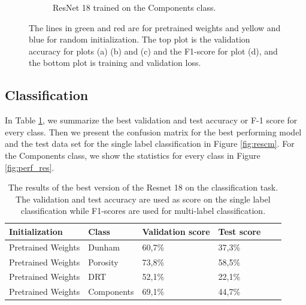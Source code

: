 \begin{figure}
{\begin{subfigure}[b]{.6\textwidth}
\label{fig:resinit_comp}
\caption{ResNet 18 trained on the Components class.}
\end{subfigure}%
}
\caption[Training and validation plots for ResNet 18]{The lines in green and red are for pretrained weights and yellow and blue for random initialization. The top plot is the validation accuracy for plots (a) (b) and (c) and the F1-score for plot (d), and the bottom plot is training  and validation loss.}
\label{fig:plotres}
\end{figure}

\subsection{Classification}
In Table \ref{tab:resbest}, we summarize the best validation and test accuracy or F-1 score for every class. Then we present the confusion matrix for the best performing model and the test data set for the single label classification in Figure \ref{fig:rescm}. For the Components class, we show the statistics for every class in Figure \ref{fig:perf_res}. 

\begin{table}
\caption{\label{tab:resbest} The results of the best version of the Resnet 18 on the classification task. The validation and test accuracy are used as score on the single label classification while F1-scores are used for multi-label classification.}
\centering
\begin{tabular}[b]{| l | l | l | l | l |}
\hline
    Initialization & Class & Validation score & Test score \ \\ \hline
    Pretrained Weights & Dunham &  60,7\%  & 37,3\% \\ \hline
    Pretrained Weights & Porosity & 73,8\%  &  58,5\% \\ \hline
    Pretrained Weights &DRT & 52,1\% &  22,1\% \\ \hline
    Pretrained Weights &Components & 69,1\% &  44,7\% \\ \hline
\end{tabular} 
\end{table}

